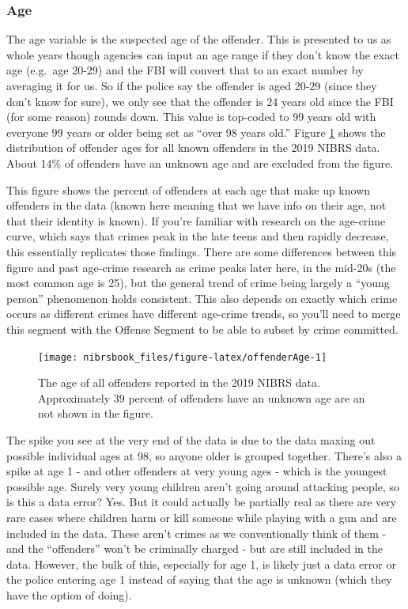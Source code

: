 \documentclass[
  12pt,
  openany]{book}
\begin{document}
\hypertarget{age}{%
\subsubsection{Age}\label{age}}

The age variable is the suspected age of the offender. This is presented to us as whole years though agencies can input an age range if they don't know the exact age (e.g.~age 20-29) and the FBI will convert that to an exact number by averaging it for us. So if the police say the offender is aged 20-29 (since they don't know for sure), we only see that the offender is 24 years old since the FBI (for some reason) rounds down. This value is top-coded to 99 years old with everyone 99 years or older being set as ``over 98 years old.'' Figure \ref{fig:offenderAge} shows the distribution of offender ages for all known offenders in the 2019 NIBRS data. About 14\% of offenders have an unknown age and are excluded from the figure.

This figure shows the percent of offenders at each age that make up known offenders in the data (known here meaning that we have info on their age, not that their identity is known). If you're familiar with research on the age-crime curve, which says that crimes peak in the late teens and then rapidly decrease, this essentially replicates those findings. There are some differences between this figure and past age-crime research as crime peaks later here, in the mid-20s (the most common age is 25), but the general trend of crime being largely a ``young person'' phenomenon holds consistent. This also depends on exactly which crime occurs as different crimes have different age-crime trends, so you'll need to merge this segment with the Offense Segment to be able to subset by crime committed.

\begin{figure}

{\centering \texttt{[image: nibrsbook\_files/figure-latex/offenderAge-1]} 

}

\caption{The age of all offenders reported in the 2019 NIBRS data. Approximately 39 percent of offenders have an unknown age are an not shown in the figure.}\label{fig:offenderAge}
\end{figure}

The spike you see at the very end of the data is due to the data maxing out possible individual ages at 98, so anyone older is grouped together. There's also a spike at age 1 - and other offenders at very young ages - which is the youngest possible age. Surely very young children aren't going around attacking people, so is this a data error? Yes. But it could actually be partially real as there are very rare cases where children harm or kill someone while playing with a gun and are included in the data. These aren't crimes as we conventionally think of them - and the ``offenders'' won't be criminally charged - but are still included in the data. However, the bulk of this, especially for age 1, is likely just a data error or the police entering age 1 instead of saying that the age is unknown (which they have the option of doing).
\end{document}
